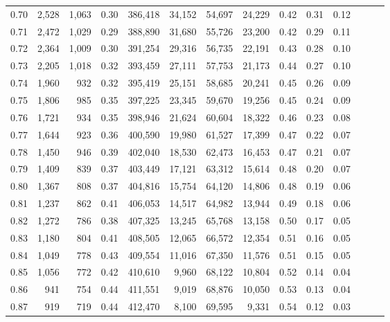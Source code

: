 \begin{tabular}{rrrrrrrrrrrrrr}
0.70 &   2,528 &  1,063 &  0.30 &  386,418 &   34,152 &  54,697 &  24,229 &  0.42 &  0.31 &      0.12 \\
0.71 &   2,472 &  1,029 &  0.29 &  388,890 &   31,680 &  55,726 &  23,200 &  0.42 &  0.29 &      0.11 \\
0.72 &   2,364 &  1,009 &  0.30 &  391,254 &   29,316 &  56,735 &  22,191 &  0.43 &  0.28 &      0.10 \\
0.73 &   2,205 &  1,018 &  0.32 &  393,459 &   27,111 &  57,753 &  21,173 &  0.44 &  0.27 &      0.10 \\
0.74 &   1,960 &    932 &  0.32 &  395,419 &   25,151 &  58,685 &  20,241 &  0.45 &  0.26 &      0.09 \\
0.75 &   1,806 &    985 &  0.35 &  397,225 &   23,345 &  59,670 &  19,256 &  0.45 &  0.24 &      0.09 \\
0.76 &   1,721 &    934 &  0.35 &  398,946 &   21,624 &  60,604 &  18,322 &  0.46 &  0.23 &      0.08 \\
0.77 &   1,644 &    923 &  0.36 &  400,590 &   19,980 &  61,527 &  17,399 &  0.47 &  0.22 &      0.07 \\
0.78 &   1,450 &    946 &  0.39 &  402,040 &   18,530 &  62,473 &  16,453 &  0.47 &  0.21 &      0.07 \\
0.79 &   1,409 &    839 &  0.37 &  403,449 &   17,121 &  63,312 &  15,614 &  0.48 &  0.20 &      0.07 \\
0.80 &   1,367 &    808 &  0.37 &  404,816 &   15,754 &  64,120 &  14,806 &  0.48 &  0.19 &      0.06 \\
0.81 &   1,237 &    862 &  0.41 &  406,053 &   14,517 &  64,982 &  13,944 &  0.49 &  0.18 &      0.06 \\
0.82 &   1,272 &    786 &  0.38 &  407,325 &   13,245 &  65,768 &  13,158 &  0.50 &  0.17 &      0.05 \\
0.83 &   1,180 &    804 &  0.41 &  408,505 &   12,065 &  66,572 &  12,354 &  0.51 &  0.16 &      0.05 \\
0.84 &   1,049 &    778 &  0.43 &  409,554 &   11,016 &  67,350 &  11,576 &  0.51 &  0.15 &      0.05 \\
0.85 &   1,056 &    772 &  0.42 &  410,610 &    9,960 &  68,122 &  10,804 &  0.52 &  0.14 &      0.04 \\
0.86 &     941 &    754 &  0.44 &  411,551 &    9,019 &  68,876 &  10,050 &  0.53 &  0.13 &      0.04 \\
0.87 &     919 &    719 &  0.44 &  412,470 &    8,100 &  69,595 &   9,331 &  0.54 &  0.12 &      0.03 \\

\end{tabular}
